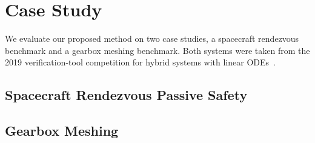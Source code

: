 \section{Case Study}
\label{sec:casestudy}

We evaluate our proposed method on two case studies, a spacecraft rendezvous benchmark and a gearbox meshing benchmark.
%
Both systems were taken from the 2019 verification-tool competition for hybrid systems with linear ODEs~\cite{archcomp19}.

\subsection{Spacecraft Rendezvous Passive Safety}
\label{ssec:rendezvous}


\subsection{Gearbox Meshing}
\label{sec:gearbox}

